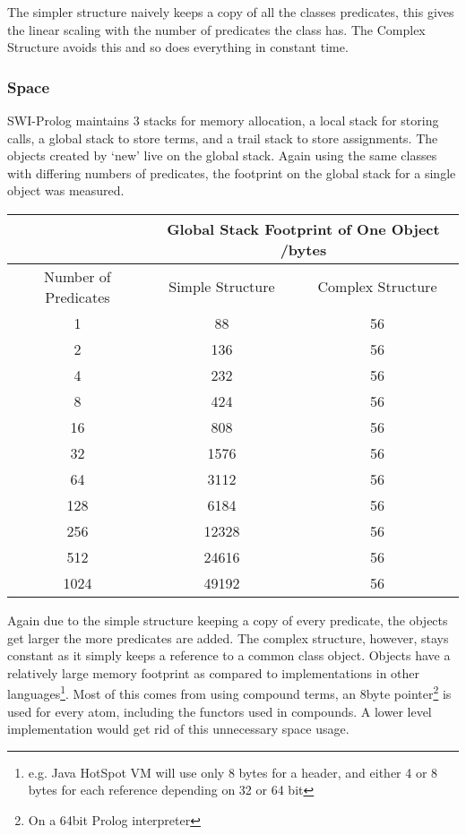\documentclass[12pt,a4paper,twoside,openright]{report}
\begin{document}
The simpler structure naively keeps a copy of all the classes predicates, this gives the linear scaling with the number of predicates the class has. The Complex Structure avoids this and so does everything in constant time.

\subsubsection{Space}

SWI-Prolog maintains 3 stacks for memory allocation, a local stack for storing calls, a global stack to store terms, and a trail stack to store assignments. The objects created by `new' live on the global stack. Again using the same classes with differing numbers of predicates, the footprint on the global stack for a single object was measured.

\begin{center}
\begin{tabular}{c|c|c}

& \multicolumn{2}{c}{Global Stack Footprint of One Object /bytes} \\
\hline
Number of Predicates & Simple Structure & Complex Structure \\
\hline
1		&	88		&	56	\\
2		&	136		&	56	\\
4		&	232		&	56	\\
8		&	424		&	56	\\
16		&	808		&	56	\\
32		&	1576	&	56	\\
64		&	3112	&	56	\\
128		&	6184	&	56	\\
256		&	12328	&	56	\\
512		&	24616	&	56	\\
1024	&	49192	&	56	\\


\end{tabular}
\end{center}

Again due to the simple structure keeping a copy of every predicate, the objects get larger the more predicates are added. The complex structure, however, stays constant as it simply keeps a reference to a common class object. Objects have a relatively large memory footprint as compared to implementations in other languages\footnote{e.g. Java HotSpot VM will use only 8 bytes for a header, and either 4 or 8 bytes for each reference depending on 32 or 64 bit}. Most of this comes from using compound terms, an 8byte pointer\footnote{On a 64bit Prolog interpreter} is used for every atom, including the functors used in compounds. A lower level implementation would get rid of this unnecessary space usage.
\end{document}
